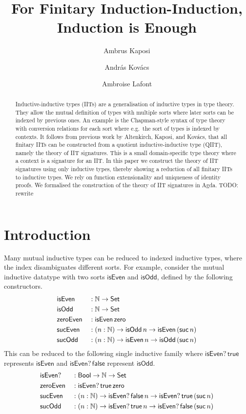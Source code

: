 \documentclass[a4paper,UKenglish,cleveref, autoref]{lipics-v2019}
\title{For Finitary Induction-Induction, \\ Induction is Enough} %
\author{Ambrus Kaposi}{E{\"o}tv{\"o}s Lor{\'a}nd University, Budapest, Hungary}{akaposi@inf.elte.hu}{https://orcid.org/0000-0001-9897-8936}{this author was supported by Thematic Excellence Programme, Industry and Digitization Subprogramme (NRDI Office, 2019) and by the European Union, co-financed by the European Social Fund (EFOP-3.6.2-16-2017-00013, Thematic Fundamental Research Collaborations Grounding Innovation in Informatics and Infocommunication).}%
\author{Andr{\'a}s Kov{\'a}cs}{E{\"o}tv{\"o}s Lor{\'a}nd University, Budapest, Hungary}{kovacsandras@inf.elte.hu}{https://orcid.org/0000-0002-6375-9781}{this author was supported by the European Union, co-financed by the European Social Fund (EFOP-3.6.3-VEKOP-16-2017-00002).}
\author{Ambroise Lafont}{IMT Atlantique, Inria, LS2N CNRS, Nantes, France}{ambroise.lafont@inria.fr}{https://orcid.org/0000-0002-9299-641X}{}
\begin{document}
\maketitle

\begin{abstract}
  Inductive-inductive types (IITs) are a generalisation of inductive types in
  type theory. They allow the mutual definition of types with multiple sorts
  where later sorts can be indexed by previous ones. An example is the
  Chapman-style syntax of type theory with conversion relations for each sort
  where e.g.\ the sort of types is indexed by contexts. It follows from previous
  work by Altenkirch, Kaposi, and Kov{\'a}cs, that all finitary IITs can be constructed from a quotient
  inductive-inductive type (QIIT), namely the theory of IIT signatures. This is
  a small domain-specific type theory where a context is a signature for an
  IIT. In this paper we construct the theory of IIT signatures using only inductive types,
  thereby showing a reduction of all finitary IITs to inductive types.  We rely
  on function extensionality and uniqueness of identity proofs. We formalised
  the construction of the theory of IIT signatures in Agda. TODO: rewrite
\end{abstract}

\section{Introduction}
\label{sec:intro}

Many mutual inductive types can be reduced to indexed inductive types, where the
index disambiguates different sorts. For example, consider the mutual inductive datatype
with two sorts
$\mathsf{isEven}$ and $\mathsf{isOdd}$, defined by the following
constructors.
\begin{alignat*}{5}
  & \mathsf{isEven} && : \mathbb{N}\rightarrow\mathsf{Set} \\
  & \mathsf{isOdd} && : \mathbb{N}\rightarrow \mathsf{Set} \\
  & \mathsf{zeroEven} && : \mathsf{isEven}\,\mathsf{zero} \\
  & \mathsf{sucEven} && : (n:\mathbb{N})\rightarrow\mathsf{isOdd}\,n\rightarrow\mathsf{isEven}\,(\mathsf{suc}\,n) \\
  & \mathsf{sucOdd} && : (n:\mathbb{N})\rightarrow\mathsf{isEven}\,n\rightarrow\mathsf{isOdd}\,(\mathsf{suc}\,n)
\end{alignat*}
This can be reduced to the following single inductive family where
$\mathsf{isEven?}\,\mathsf{true}$ represents $\mathsf{isEven}$ and
$\mathsf{isEven?}\,\mathsf{false}$ represent $\mathsf{isOdd}$.
\begin{alignat*}{5}
  & \mathsf{isEven?} && : \mathsf{Bool}\rightarrow\mathbb{N}\rightarrow\mathsf{Set} \\
  & \mathsf{zeroEven} && : \mathsf{isEven?}\,\mathsf{true}\,\mathsf{zero} \\
  & \mathsf{sucEven} && : (n:\mathbb{N})\rightarrow\mathsf{isEven?}\,\mathsf{false}\,n\rightarrow\mathsf{isEven?}\,\mathsf{true}\,(\mathsf{suc}\,n) \\
  & \mathsf{sucOdd} && : (n:\mathbb{N})\rightarrow\mathsf{isEven?}\,\mathsf{true}\,n\rightarrow\mathsf{isEven?}\,\mathsf{false}\,(\mathsf{suc}\,n)
\end{alignat*}
\end{document}

